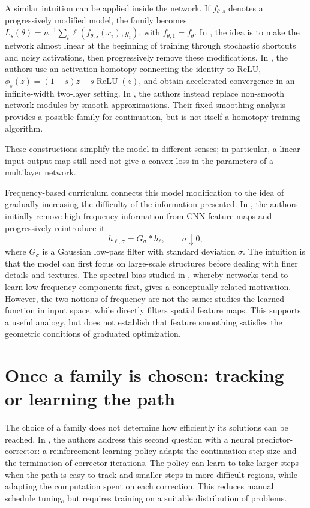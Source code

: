 \documentclass[11pt,a4paper]{article}
\begin{document}
A similar intuition can be applied inside the network. If
$f_{\theta,s}$ denotes a progressively modified model, the family becomes
$L_s(\theta)=n^{-1}\sum_i\ell(f_{\theta,s}(x_i),y_i)$, with
$f_{\theta,1}=f_\theta$. In \cite{gulcehre2017mollifying}, the idea is to
make the network almost linear at the beginning of training through
stochastic shortcuts and noisy activations, then progressively remove
these modifications. In \cite{yang2025homotopy}, the authors use an
activation homotopy connecting the identity to ReLU,
$\phi_s(z)=(1-s)z+s\operatorname{ReLU}(z)$, and obtain accelerated
convergence in an infinite-width two-layer setting. In
\cite{roulet2021smoothing}, the authors instead replace non-smooth network
modules by smooth approximations. Their fixed-smoothing analysis provides
a possible family for continuation, but is not itself a homotopy-training
algorithm.

These constructions simplify the model in different senses;
in particular, a linear input-output map still need not give a convex
loss in the parameters of a multilayer network.

Frequency-based curriculum connects this model modification to the idea
of gradually increasing the difficulty of the information presented.
In \cite{sinha2020curriculum}, the authors initially remove high-frequency
information from CNN feature maps and progressively reintroduce it:
\[
    h_{\ell,\sigma}=G_\sigma*h_\ell,
    \qquad \sigma\downarrow0,
\]
where $G_\sigma$ is a Gaussian low-pass filter with standard deviation
$\sigma$. The intuition is that the model can first focus on large-scale
structures before dealing with finer details and textures. The spectral
bias studied in \cite{rahaman2019spectral}, whereby
networks tend to learn low-frequency components first, gives a
conceptually related motivation. However, the two notions of frequency
are not the same: \cite{rahaman2019spectral} studies the learned function
in input space, while \cite{sinha2020curriculum} directly filters spatial feature maps. This supports a useful analogy,
but does not establish that feature smoothing satisfies the geometric
conditions of graduated optimization.

\section{Once a family is chosen: tracking or learning the path}

The choice of a family does not determine how efficiently its solutions
can be reached. In \cite{mai2026neural}, the authors address this second
question with a neural predictor-corrector: a reinforcement-learning
policy adapts the continuation step size and the termination of corrector
iterations. The policy can learn to take larger steps when the path is
easy to track and smaller steps in more difficult regions, while adapting
the computation spent on each correction. This reduces manual schedule
tuning, but requires training on a suitable distribution of problems.
\end{document}
